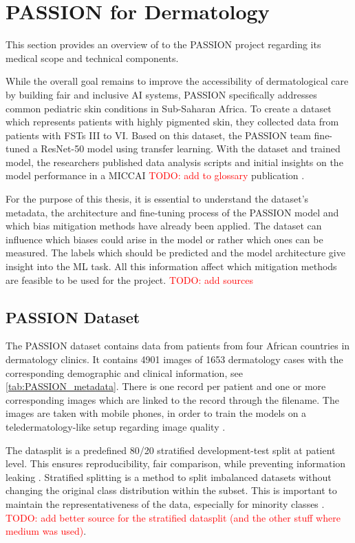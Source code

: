\documentclass[12pt, a4paper, oneside]{book}   	%
\renewcommand{\todo}[1]{\textcolor{red}{TODO: #1}}
\begin{document}
		
		\section{PASSION for Dermatology}
			This section provides an overview of to the PASSION project regarding its medical scope and technical components.
			
			While the overall goal remains to improve the accessibility of dermatological care by building fair and inclusive AI systems, PASSION specifically addresses common \gls{pediatric} skin conditions in Sub-Saharan Africa. To create a dataset which represents patients with highly pigmented skin, they collected data from patients with \glspl{FST} III to VI. Based on this dataset, the PASSION team fine-tuned a ResNet-50 model using transfer learning. With the dataset and trained model, the researchers published data analysis scripts and initial insights on the model performance in a MICCAI \todo{add to glossary} publication \autocite{Gottfrois2024}.
			
			For the purpose of this thesis, it is essential to understand the dataset's metadata, the architecture and fine-tuning process of the PASSION model and which bias mitigation methods have already been applied. The dataset can influence which biases could arise in the model or rather which ones can be measured. The labels which should be predicted and the model architecture give insight into the \gls{ML} task. All this information affect which mitigation methods are feasible to be used for the project. \todo{add sources}
			
			\subsection{PASSION Dataset}
				The PASSION dataset contains data from patients from four African countries in dermatology clinics. It contains 4901 images of 1653 dermatology cases with the corresponding demographic and clinical information, see \autoref{tab:PASSION_metadata}. There is one record per patient and one or more corresponding images which are linked to the record through the filename. The images are taken with mobile phones, in order to train the models on a \gls{teledermatology}-like setup regarding image quality \autocite{Gottfrois2024}.
				
			    The datasplit is a predefined 80/20 stratified development-test split at patient level. This ensures reproducibility, fair comparison, while preventing information leaking \autocite{Gottfrois2024}. Stratified splitting is a method to split imbalanced datasets without changing the original class distribution within the subset. This is important to maintain the representativeness of the data, especially for minority classes \autocite{Balde_2023}. \todo{add better source for the stratified datasplit (and the other stuff where medium was used)}.
			    
\end{document}
